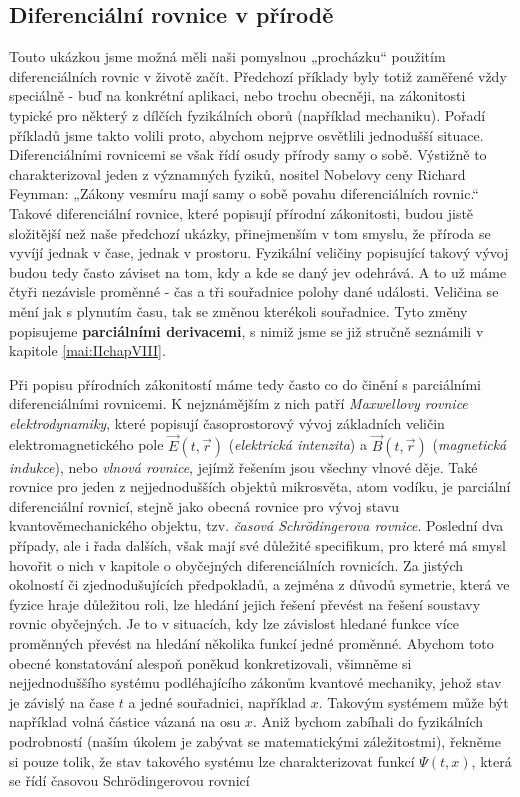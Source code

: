     \subsection{Diferenciální rovnice v přírodě}
      Touto ukázkou jsme možná měli naši pomyslnou „procházku“ použitím diferenciálních rovnic v
      životě začít. Předchozí příklady byly totiž zaměřené vždy speciálně - buď na konkrétní
      aplikaci, nebo trochu obecněji, na zákonitosti typické pro některý z dílčích fyzikálních oborů
      (například mechaniku). Pořadí příkladů jsme takto volili proto, abychom nejprve osvětlili
      jednodušší situace. Diferenciálními rovnicemi se však řídí osudy přírody samy o sobě. Výstižně
      to charakterizoval jeden z významných fyziků, nositel Nobelovy ceny Richard Feynman: „Zákony
      vesmíru mají samy o sobě povahu diferenciálních rovnic.“ Takové diferenciální rovnice, které
      popisují přírodní zákonitosti, budou jistě složitější než naše předchozí ukázky, přinejmenším
      v tom smyslu, že příroda se vyvíjí jednak v čase, jednak v prostoru. Fyzikální veličiny
      popisující takový vývoj budou tedy často záviset na tom, kdy a kde se daný jev odehrává. A to
      už máme čtyři nezávisle proměnné - čas a tři souřadnice polohy dané události. Veličina se mění
      jak s plynutím času, tak se změnou kterékoli souřadnice. Tyto změny popisujeme
      \textbf{parciálními derivacemi}, s nimiž jsme se již stručně seznámili v kapitole
      \ref{mai:IIchapVIII}. 
      
      Při popisu přírodních zákonitostí máme tedy často co do činění s parciálními diferenciálními
      rovnicemi. K nejznámějším z nich patří \emph{Maxwellovy rovnice elektrodynamiky}, které
      popisují časoprostorový vývoj základních veličin elektromagnetického pole
      \(\vec{E}(t,\vec{r})\) (\emph{elektrická intenzita}) a \(\vec{B}(t,\vec{r})\)
      (\emph{magnetická indukce}), nebo \emph{vlnová rovnice}, jejímž řešením jsou všechny vlnové
      děje. Také rovnice pro jeden z nejjednodušších objektů mikrosvěta, atom vodíku, je parciální
      diferenciální rovnicí, stejně jako obecná rovnice pro vývoj stavu kvantověmechanického
      objektu, tzv. \emph{časová Schrödingerova rovnice}. Poslední dva případy, ale i řada dalších,
      však mají své důležité specifikum, pro které má smysl hovořit o nich v kapitole o obyčejných
      diferenciálních rovnicích. Za jistých okolností či zjednodušujících předpokladů, a zejména z
      důvodů symetrie, která ve fyzice hraje důležitou roli, lze hledání jejich řešení převést na
      řešení soustavy rovnic obyčejných.  Je to v situacích, kdy lze závislost hledané funkce více
      proměnných převést na hledání několika funkcí jedné proměnné. Abychom toto obecné konstatování
      alespoň poněkud konkretizovali, všimněme si nejjednoduššího systému podléhajícího zákonům
      kvantové mechaniky, jehož stav je závislý na čase \(t\) a jedné souřadnici, například \(x\).
      Takovým systémem může být například volná částice vázaná na osu \(x\). Aniž bychom zabíhali do
      fyzikálních podrobností (naším úkolem je zabývat se matematickými záležitostmi), řekněme si
      pouze tolik, že stav takového systému lze charakterizovat funkcí \(\Psi(t,x)\), která se řídí
      časovou Schrödingerovou rovnicí
      
